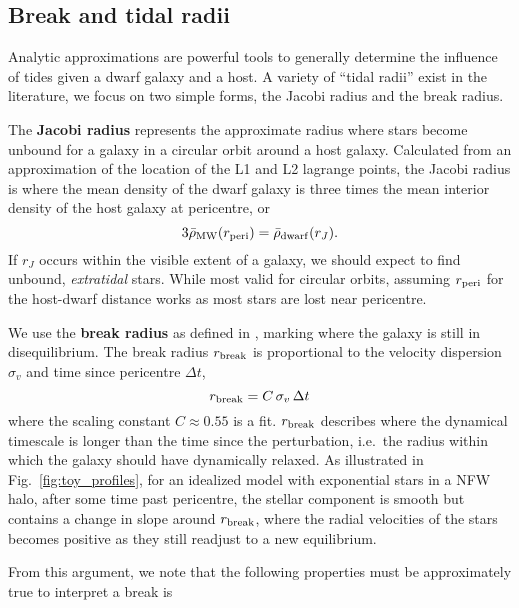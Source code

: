 \subsection{Break and tidal radii}\label{break-and-tidal-radii}

Analytic approximations are powerful tools to generally determine the
influence of tides given a dwarf galaxy and a host. A variety of ``tidal
radii'' exist in the literature, we focus on two simple forms, the
Jacobi radius and the break radius.

The \textbf{Jacobi radius} represents the approximate radius where stars
become unbound for a galaxy in a circular orbit around a host galaxy.
Calculated from an approximation of the location of the L1 and L2
lagrange points, the Jacobi radius is where the mean density of the
dwarf galaxy is three times the mean interior density of the host galaxy
at pericentre, or \begin{equation}{
3\bar \rho_{\rm MW}(r_{\rm peri}) = \bar \rho_{\rm dwarf}(r_J).
}\end{equation} If \(r_J\) occurs within the visible extent of a galaxy,
we should expect to find unbound, \emph{extratidal} stars. While most
valid for circular orbits, assuming \(r_{\rm peri}\) for the host-dwarf
distance works as most stars are lost near pericentre.

We use the \textbf{break radius} as defined in \citet{penarrubia+2009},
marking where the galaxy is still in disequilibrium. The break radius
\(r_{\rm break}\) is proportional to the velocity dispersion
\(\sigma_v\) and time since pericentre \(\Delta t\), \begin{equation}{
r_{\rm break} = C\,\sigma_{v}\,\Delta t
}\end{equation} where the scaling constant \(C \approx 0.55\) is a fit.
\(r_{\rm break}\) describes where the dynamical timescale is longer than
the time since the perturbation, i.e.~the radius within which the galaxy
should have dynamically relaxed. As illustrated in
Fig.~\ref{fig:toy_profiles}, for an idealized model with exponential
stars in a NFW halo, after some time past pericentre, the stellar
component is smooth but contains a change in slope around
\(r_{\rm break}\), where the radial velocities of the stars becomes
positive as they still readjust to a new equilibrium.

From this argument, we note that the following properties must be
approximately true to interpret a break is

